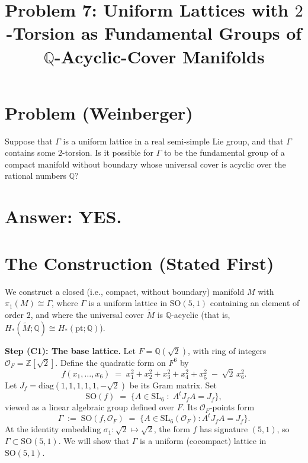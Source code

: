 \documentclass[12pt]{article}
\title{Problem 7: Uniform Lattices with $2$-Torsion as Fundamental Groups of $\mathbb{Q}$-Acyclic-Cover Manifolds}
\author{}
\date{}
\theoremstyle{definition}
\begin{document}
\maketitle

\section*{Problem (Weinberger)}

Suppose that $\Gamma$ is a uniform lattice in a real semi-simple Lie group, and that $\Gamma$ contains some $2$-torsion. Is it possible for $\Gamma$ to be the fundamental group of a compact manifold without boundary whose universal cover is acyclic over the rational numbers $\mathbb{Q}$?

\section*{Answer: YES.}

\section{The Construction (Stated First)}

We construct a closed (i.e., compact, without boundary) manifold $M$ with $\pi_1(M)\cong\Gamma$, where $\Gamma$ is a uniform lattice in $\mathrm{SO}(5,1)$ containing an element of order $2$, and where the universal cover $\widetilde{M}$ is $\mathbb{Q}$-acyclic (that is, $H_*(\widetilde{M};\mathbb{Q})\cong H_*(\mathrm{pt};\mathbb{Q})$).

\medskip

\noindent\textbf{Step (C1): The base lattice.} Let $F=\mathbb{Q}(\sqrt{2})$, with ring of integers $\mathcal{O}_F=\mathbb{Z}[\sqrt{2}]$. Define the quadratic form on $F^6$ by
\begin{equation}\label{eq:form}
f(x_1,\dots,x_6) \;=\; x_1^2+x_2^2+x_3^2+x_4^2+x_5^2 \;-\; \sqrt{2}\,x_6^2.
\end{equation}
Let $J_f = \mathrm{diag}(1,1,1,1,1,-\sqrt{2})$ be its Gram matrix. Set
\[
\mathrm{SO}(f) \;=\; \{ A\in\mathrm{SL}_6 \;:\; A^t J_f A = J_f \},
\]
viewed as a linear algebraic group defined over $F$. Its $\mathcal{O}_F$-points form
\[
\Gamma \;:=\; \mathrm{SO}(f,\mathcal{O}_F) \;=\; \{ A\in\mathrm{SL}_6(\mathcal{O}_F) : A^t J_f A = J_f\}.
\]
At the identity embedding $\sigma_1:\sqrt{2}\mapsto\sqrt{2}$, the form $f$ has signature $(5,1)$, so $\Gamma\subset\mathrm{SO}(5,1)$. We will show that $\Gamma$ is a uniform (cocompact) lattice in $\mathrm{SO}(5,1)$.
\end{document}
